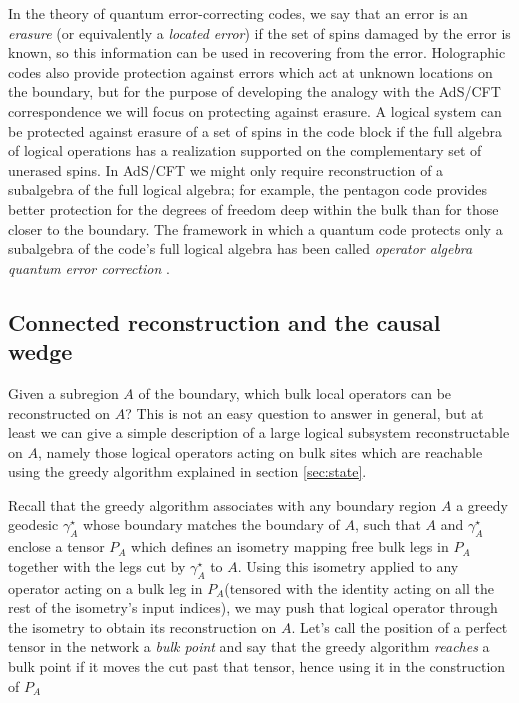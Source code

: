 \documentclass[12pt]{article}
\theoremstyle{plain}
\theoremstyle{plain}
\theoremstyle{plain}
\theoremstyle{plain}
\theoremstyle{result}
\theoremstyle{remark}
\theoremstyle{conjecture}
\theoremstyle{observation}
\theoremstyle{definition}
\theoremstyle{corollary}
\theoremstyle{definition}
\theoremstyle{definition}
\theoremstyle{assumption}
\theoremstyle{definition}
\theoremstyle{problem}
\theoremstyle{fact}
\begin{document}
In the theory of quantum error-correcting codes, we say that an error is an \textit{erasure} (or equivalently a \textit{located error}) if the set of spins damaged by the error is known, so this information can be used in recovering from the error. Holographic codes also provide protection against errors which act at unknown locations on the boundary, but for the purpose of developing the analogy with the AdS/CFT correspondence we will focus on protecting against erasure. A logical system can be protected against erasure of a set of spins in the code block if the full algebra of logical operations has a realization supported on the complementary set of unerased spins. In AdS/CFT we might only require reconstruction of a subalgebra of the full logical algebra; for example, the pentagon code provides better protection for the degrees of freedom deep within the bulk than for those closer to the boundary. The framework in which a quantum code protects only a subalgebra of the code's full logical algebra has been called \textit{operator algebra quantum error correction} \cite{Kribs2005, Kribs2006, Beny2007, Beny2007a}.
  
\subsection{Connected reconstruction and the causal wedge}

Given a subregion $A$ of the boundary, which bulk local operators can be reconstructed on $A$? This is not an easy question to answer in general, but at least we can give a simple description of a large logical subsystem reconstructable on $A$, namely those logical operators acting on bulk sites which are reachable using the greedy algorithm explained in section \ref{sec:state}.

Recall that the greedy algorithm associates with any boundary region $A$ a greedy geodesic $\gamma_A^\star$ whose boundary matches the boundary of $A$, such that $A$ and $\gamma_A^\star$ enclose a tensor $P_A$ which defines an isometry mapping free bulk legs in $P_A$ together with the legs cut by $\gamma^\star_A$ to $A$. Using this isometry applied to any operator acting on a bulk leg in $P_A$(tensored with the identity acting on all the rest of the isometry's input indices), we may push that logical operator through the isometry to obtain its reconstruction on $A$. Let's call the position of a perfect tensor in the network a \textit{bulk point} and say that the greedy algorithm \textit{reaches} a bulk point if it moves the cut past that tensor, hence using it in the construction of $P_A$
\end{document}
